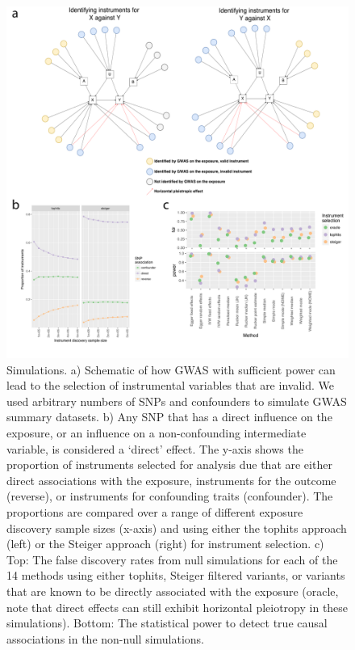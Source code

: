 \documentclass[]{article}
\begin{document}
\begin{figure}
\centering
\includegraphics{images/fig1.pdf}
\caption{Simulations. a) Schematic of how GWAS with sufficient power can
lead to the selection of instrumental variables that are invalid. We
used arbitrary numbers of SNPs and confounders to simulate GWAS summary
datasets. b) Any SNP that has a direct influence on the exposure, or an
influence on a non-confounding intermediate variable, is considered a
`direct' effect. The y-axis shows the proportion of instruments selected
for analysis due that are either direct associations with the exposure,
instruments for the outcome (reverse), or instruments for confounding
traits (confounder). The proportions are compared over a range of
different exposure discovery sample sizes (x-axis) and using either the
tophits approach (left) or the Steiger approach (right) for instrument
selection. c) Top: The false discovery rates from null simulations for
each of the 14 methods using either tophits, Steiger filtered variants,
or variants that are known to be directly associated with the exposure
(oracle, note that direct effects can still exhibit horizontal
pleiotropy in these simulations). Bottom: The statistical power to
detect true causal associations in the non-null simulations.}
\end{figure}
\end{document}
